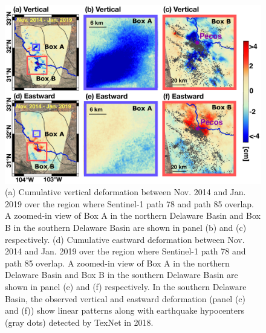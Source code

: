 \begin{figure}[hbt!]
	\centering
	\includegraphics[width=0.96\linewidth]{paper1-permian/figures/figure4-east-vertical-6panel-labelled.pdf}
	\caption[Cumulative vertical and horizontal deformation]{(a) Cumulative vertical deformation between Nov. 2014 and Jan. 2019 over the region where Sentinel-1 path 78 and path 85 overlap. A zoomed-in view of Box A in the northern Delaware Basin and Box B in the southern Delaware Basin are shown in panel (b) and (c) respectively. (d) Cumulative eastward deformation between Nov. 2014 and Jan. 2019 over the region where Sentinel-1 path 78 and path 85 overlap. A zoomed-in view of Box A in the northern Delaware Basin and Box B in the southern Delaware Basin are shown in panel (e) and (f) respectively. In the southern Delaware Basin, the observed vertical and eastward deformation (panel (c) and (f)) show linear patterns along with earthquake hypocenters (gray dots) detected by TexNet in 2018.}
	\label{fig:insar-decomp}
\end{figure}


